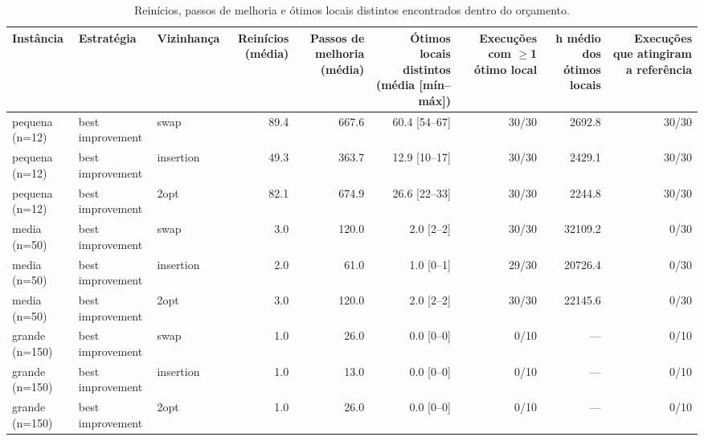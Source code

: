 \begin{table}[ht]
\centering
\small
\caption{Reinícios, passos de melhoria e ótimos locais distintos encontrados dentro do orçamento.}
\label{tab:otimos_locais}
\begin{tabular}{lllrrrrrr}
\hline
Instância & Estratégia & Vizinhança & Reinícios (média) & Passos de melhoria (média) & Ótimos locais distintos (média [mín–máx]) & Execuções com $\geq$1 ótimo local & h médio dos ótimos locais & Execuções que atingiram a referência \\
\hline
pequena (n=12) & best improvement & swap & 89.4 & 667.6 & 60.4 [54–67] & 30/30 & 2692.8 & 30/30 \\
pequena (n=12) & best improvement & insertion & 49.3 & 363.7 & 12.9 [10–17] & 30/30 & 2429.1 & 30/30 \\
pequena (n=12) & best improvement & 2opt & 82.1 & 674.9 & 26.6 [22–33] & 30/30 & 2244.8 & 30/30 \\
\hline
media (n=50) & best improvement & swap & 3.0 & 120.0 & 2.0 [2–2] & 30/30 & 32109.2 & 0/30 \\
media (n=50) & best improvement & insertion & 2.0 & 61.0 & 1.0 [0–1] & 29/30 & 20726.4 & 0/30 \\
media (n=50) & best improvement & 2opt & 3.0 & 120.0 & 2.0 [2–2] & 30/30 & 22145.6 & 0/30 \\
\hline
grande (n=150) & best improvement & swap & 1.0 & 26.0 & 0.0 [0–0] & 0/10 & — & 0/10 \\
grande (n=150) & best improvement & insertion & 1.0 & 13.0 & 0.0 [0–0] & 0/10 & — & 0/10 \\
grande (n=150) & best improvement & 2opt & 1.0 & 26.0 & 0.0 [0–0] & 0/10 & — & 0/10 \\
\hline
\end{tabular}
\end{table}
